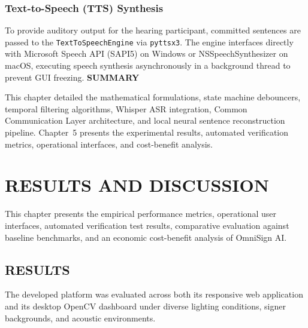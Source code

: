 \documentclass[12pt,a4paper]{report}
\begin{document}
\subsection{Text-to-Speech (TTS) Synthesis}
To provide auditory output for the hearing participant, committed sentences are passed to the \texttt{TextToSpeechEngine} via \texttt{pyttsx3}. The engine interfaces directly with Microsoft Speech API (SAPI5) on Windows or NSSpeechSynthesizer on macOS, executing speech synthesis asynchronously in a background thread to prevent GUI freezing.
\vspace{0.2cm}
\noindent\textbf{SUMMARY}\nopagebreak\par\vspace{0.1cm}
This chapter detailed the mathematical formulations, state machine debouncers, temporal filtering algorithms, Whisper ASR integration, Common Communication Layer architecture, and local neural sentence reconstruction pipeline. Chapter~5 presents the experimental results, automated verification metrics, operational interfaces, and cost-benefit analysis.
\clearpage

\chapter{RESULTS AND DISCUSSION} \label{chap:results}
This chapter presents the empirical performance metrics, operational user interfaces, automated verification test results, comparative evaluation against baseline benchmarks, and an economic cost-benefit analysis of OmniSign AI.

\section{RESULTS} \label{sec:res-ui}
The developed platform was evaluated across both its responsive web application and its desktop OpenCV dashboard under diverse lighting conditions, signer backgrounds, and acoustic environments.
\end{document}
